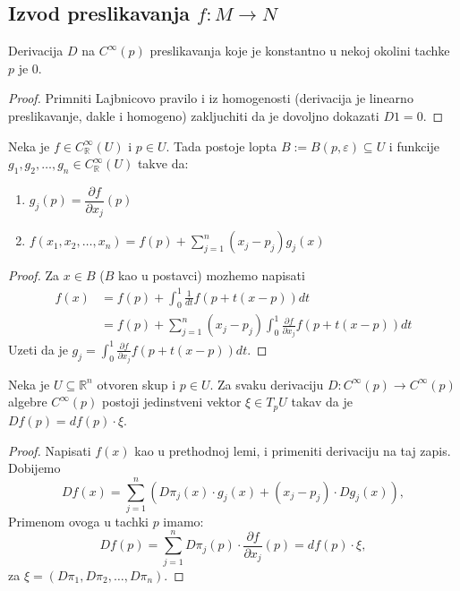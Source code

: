 \documentclass[a4paper,12pt]{article}
\newcommand{\RR}{\mathbb{R}}
\newcommand{\eps}{\varepsilon}
\newcommand{\psj}{\subseteq}
\newcommand{\ds}{\displaystyle}
\begin{document}
\subsection{Izvod preslikavanja $f:M \to N$}

\begin{lema}
	Derivacija $D$ na $C^\infty(p)$ preslikavanja koje je konstantno u nekoj okolini tachke $p$ je 0.
\end{lema}
\begin{proof}
	Primniti Lajbnicovo pravilo i iz homogenosti (derivacija je linearno preslikavanje, dakle i homogeno) zakljuchiti
	da je dovoljno dokazati $D1 = 0$.
\end{proof}

\begin{lema}
	Neka je $f \in C^\infty_\RR (U)$ i $p \in U$. Tada postoje lopta $B := B(p, \eps) \psj U$ i funkcije
	$g_1, g_2, \dotso, g_n \in C^\infty_\RR (U)$ takve da:
	\begin{enumerate}
		\item $g_j(p) = \dfrac{\partial f}{\partial x_j}(p)$
		\item $\ds{f(x_1, x_2, \dotso, x_n) = f(p) + \sum_{j=1}^n(x_j - p_j)g_j(x)}$
	\end{enumerate}
\end{lema}
\begin{proof}
	Za $x \in B$ ($B$ kao u postavci) mozhemo napisati
	\begin{align*}
		f(x) &= f(p) + \int_0^1 \frac{1}{dt}f(p+t(x-p))dt\\
			 &= f(p) + \sum_{j=1}^n(x_j - p_j)\int_0^1 \frac{\partial f}{\partial x_j}f(p+t(x-p))dt
	\end{align*}
	Uzeti da je \(\ds{ g_j = \int_0^1 \frac{\partial f}{\partial x_j}f(p+t(x-p))dt }\).
\end{proof}

\begin{tma}
	Neka je $U\psj \RR^n$ otvoren skup i $p\in U$. Za svaku derivaciju $D : C^\infty(p)\to C^\infty(p)$
	algebre $C^\infty(p)$ postoji jedinstveni vektor $\xi \in T_p U$ takav da je $Df(p) = df(p)\cdot \xi$.
\end{tma}
\begin{proof}
	Napisati $f(x)$ kao u prethodnoj lemi, i primeniti derivaciju na taj zapis. Dobijemo
	\[ Df(x) = \sum_{j=1}^n(D\pi_j(x)\cdot g_j(x) + (x_j - p_j)\cdot Dg_j(x)) ,\] 
	Primenom ovoga u tachki $p$ imamo:
	\[ Df(p) = \sum_{j=1}^nD\pi_j(p)\cdot \dfrac{\partial f}{\partial x_j}(p) = df(p)\cdot \xi ,\]
	za $\xi = (D\pi_1, D\pi_2, \dotso, D\pi_n)$.
\end{proof}
\end{document}
